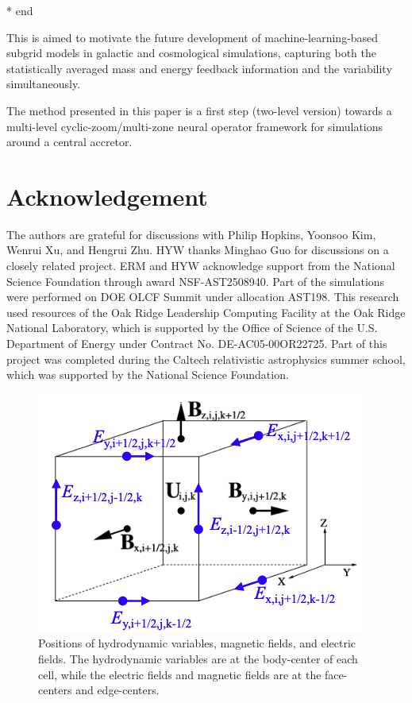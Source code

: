 \documentclass{article}
\newcommand{\hywcom}[1]{{\color{purple}{[HYW: #1]}}}
\begin{document}
* end

This is aimed to motivate the future development of machine-learning-based subgrid models in galactic and cosmological simulations, capturing both the statistically averaged mass and energy feedback information and the variability simultaneously.

\hywcom{Future Prospective.}
The method presented in this paper is a first step (two-level version) towards a multi-level cyclic-zoom/multi-zone neural operator framework for simulations around a central accretor.

\section{Acknowledgement}
The authors are grateful for discussions with Philip Hopkins, Yoonsoo Kim, Wenrui Xu, and Hengrui Zhu.
HYW thanks Minghao Guo for discussions on a closely related project.
ERM and HYW acknowledge support from the National Science Foundation through award NSF-AST2508940.
Part of the simulations were performed on DOE OLCF Summit under allocation AST198.
This research used resources of the Oak Ridge Leadership Computing Facility at the Oak Ridge National Laboratory, which is supported by the Office of Science of the U.S. Department of Energy under Contract No. DE-AC05-00OR22725. 
Part of this project was completed during the Caltech relativistic astrophysics summer school, which was supported by the National Science Foundation. 



\clearpage

\appendix
\onecolumngrid

\begin{figure}
    \centering
    \includegraphics[width=0.3\linewidth]{figures/ct.png}
    \caption{
    Positions of hydrodynamic variables, magnetic fields, and electric fields. The hydrodynamic variables are at the body-center of each cell, while the electric fields and magnetic fields are at the face-centers and edge-centers.
    } 
    \label{fig:ct}
\end{figure}
\end{document}
